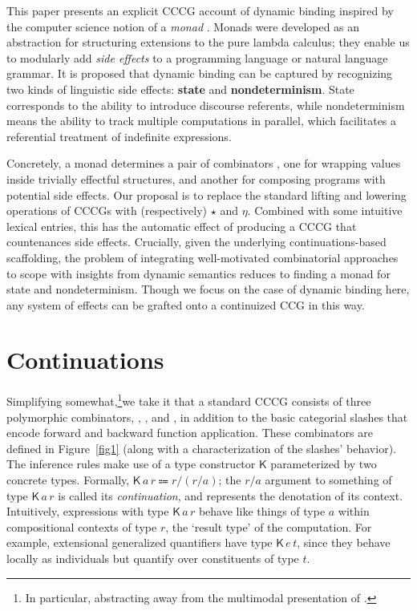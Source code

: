   This paper presents an explicit CCCG account of dynamic binding inspired by the computer science notion of a \emph{monad} \citep[e.g.][]{Moggi:1989, Wadler:1992, Wadler:1994, Wadler:1995, Shan:2002}. Monads were developed as an abstraction for structuring extensions to the pure lambda calculus; they enable us to modularly add \emph{side effects} \citep[cf.][]{Shan:2005} to a programming language or natural language grammar. It is proposed that dynamic binding can be captured by recognizing two kinds of linguistic side effects: \textbf{state} and \textbf{nondeterminism}. State corresponds to the ability to introduce discourse referents, while nondeterminism means the ability to track multiple computations in parallel, which facilitates a referential treatment of indefinite expressions. %
	
  Concretely, a monad determines a pair of combinators \ab{\eta,\,\star}, one for wrapping values inside trivially effectful structures, and another for composing programs with potential side effects. Our proposal is to replace the standard lifting and lowering operations of CCCGs with (respectively) $\star$ and $\eta$. Combined with some intuitive lexical entries, this has the automatic effect of producing a CCCG that countenances side effects. Crucially, given the underlying continuations-based scaffolding, the problem of integrating well-motivated combinatorial approaches to scope with insights from dynamic semantics reduces to finding a monad for state and nondeterminism. Though we focus on the case of dynamic binding here, any system of effects can be grafted onto a continuized CCG in this way.%

\section{Continuations}
  Simplifying somewhat,\footnote{In particular, abstracting away from the multimodal presentation of \citealt{ShanBarker:2006, BarkerShan:2008, BarkerShan:2014}.}we take it that a standard CCCG consists of three polymorphic combinators, , , and , in addition to the basic categorial slashes that encode forward and backward function application. These combinators are defined in Figure~\ref{fig1} (along with a characterization of the slashes' behavior). The inference rules make use of a type constructor $\textsf{K}$ parameterized by two concrete types. Formally, $\textsf{K}\,a\,r \Coloneqq r/(r/a)$; the $r/a$ argument to something of type $\textsf{K}\,a\,r$ is called its \emph{continuation}, and represents the denotation of its context. Intuitively, expressions with type $\textsf{K}\,a\,r$ behave like things of type $a$ within compositional contexts of type $r$, the `result type' of the computation. For example, extensional generalized quantifiers have type $\textsf{K}\,e\,t$, since they behave locally as individuals but quantify over constituents of type $t$.%

